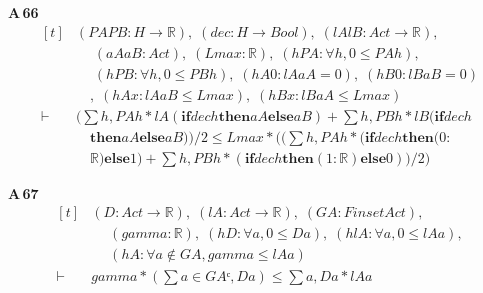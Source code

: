 \noindent\textbf{A\,66}\quad{}
{\footnotesize\[ \begin{aligned}[t]
&(\mathit{PA} \mathit{PB} : \mathit{H} \to \mathbb{R} ),\; (\mathit{dec} : \mathit{H} \to \mathit{Bool}),\; (\mathit{lA} \mathit{lB} : \mathit{Act} \to \mathbb{R} ),\\
&\quad \; (\mathit{aA} \mathit{aB} : \mathit{Act}),\; (\mathit{Lmax} : \mathbb{R} ),\; (\mathit{hPA} : \forall \mathit{h}, 0 \leq \mathit{PA} \mathit{h}),\\
&\quad \; (\mathit{hPB} : \forall \mathit{h}, 0 \leq \mathit{PB} \mathit{h}),\; (\mathit{hA0} : \mathit{lA} \mathit{aA} = 0),\; (\mathit{hB0} : \mathit{lB} \mathit{aB} = 0)\\
&\quad ,\; (\mathit{hAx} : \mathit{lA} \mathit{aB} \leq \mathit{Lmax}),\; (\mathit{hBx} : \mathit{lB} \mathit{aA} \leq \mathit{Lmax})\\
\vdash\;&(\textstyle\sum \mathit{h}, \mathit{PA} \mathit{h} * \mathit{lA} (\mathbf{if} \mathit{dec} \mathit{h} \mathbf{then} \mathit{aA} \mathbf{else} \mathit{aB}) + \textstyle\sum \mathit{h}, \mathit{PB} \mathit{h} * \mathit{lB} (\mathbf{if} \mathit{dec} \mathit{h}\\
&\quad \mathbf{then} \mathit{aA} \mathbf{else} \mathit{aB})) / 2 \leq \mathit{Lmax} * ((\textstyle\sum \mathit{h}, \mathit{PA} \mathit{h} * (\mathbf{if} \mathit{dec} \mathit{h} \mathbf{then} (0:\\
&\quad \mathbb{R} ) \mathbf{else} 1) + \textstyle\sum \mathit{h}, \mathit{PB} \mathit{h} * (\mathbf{if} \mathit{dec} \mathit{h} \mathbf{then} (1:\mathbb{R} ) \mathbf{else} 0)) / 2)
\end{aligned} \]}

\noindent\textbf{A\,67}\quad{}
{\footnotesize\[ \begin{aligned}[t]
&(\mathit{D} : \mathit{Act} \to \mathbb{R} ),\; (\mathit{lA} : \mathit{Act} \to \mathbb{R} ),\; (\mathit{GA} : \mathit{Finset} \mathit{Act}),\\
&\quad \; (\mathit{gamma} : \mathbb{R} ),\; (\mathit{hD} : \forall \mathit{a}, 0 \leq \mathit{D} \mathit{a}),\; (\mathit{hlA} : \forall \mathit{a}, 0 \leq \mathit{lA} \mathit{a}),\\
&\quad \; (\mathit{hA} : \forall \mathit{a} \notin \mathit{GA}, \mathit{gamma} \leq \mathit{lA} \mathit{a})\\
\vdash\;&\mathit{gamma} * (\textstyle\sum \mathit{a} \in \mathit{GAᶜ}, \mathit{D} \mathit{a}) \leq \textstyle\sum \mathit{a}, \mathit{D} \mathit{a} * \mathit{lA} \mathit{a}
\end{aligned} \]}

